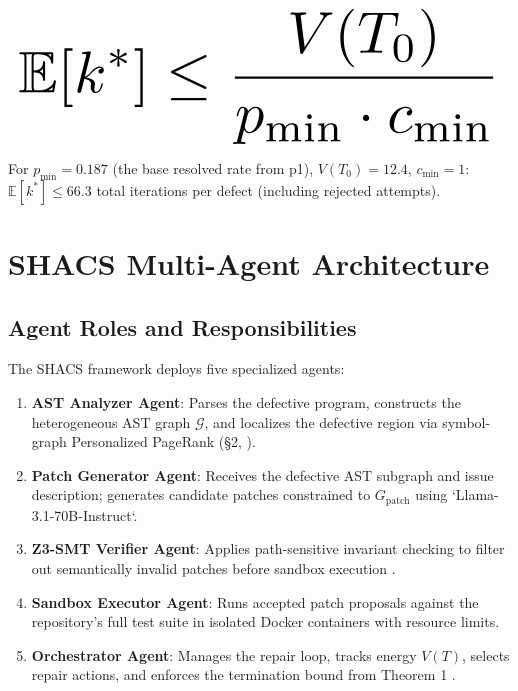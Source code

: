 \documentclass[10pt,twocolumn,letterpaper]{article}
\begin{document}
\begin{equation}
\resizebox{\columnwidth}{!}{$\displaystyle
\begin{aligned}
\mathbb{E}[k^*] \leq \frac{V(T_0)}{p_{\min} \cdot c_{\min}}
\end{aligned}
$}
\end{equation}
























For $p_{\min} = 0.187$ (the base resolved rate from p1), $V(T_0) = 12.4$, $c_{\min} = 1$: $\mathbb{E}[k^*] \leq 66.3$ total iterations per defect (including rejected attempts).




\section{SHACS Multi-Agent Architecture}



\subsection{Agent Roles and Responsibilities}


The SHACS framework deploys five specialized agents:

\begin{enumerate}
  \item \textbf{AST Analyzer Agent}: Parses the defective program, constructs the heterogeneous AST graph $\mathcal{G}$, and localizes the defective region via symbol-graph Personalized PageRank (\S{}2, \cite{crossref_10_1145_3689096_3689462}).
  \item \textbf{Patch Generator Agent}: Receives the defective AST subgraph and issue description; generates candidate patches constrained to $G_{\text{patch}}$ using `Llama-3.1-70B-Instruct`.
  \item \textbf{Z3-SMT Verifier Agent}: Applies path-sensitive invariant checking to filter out semantically invalid patches before sandbox execution \cite{arxiv_2404_01131}.
  \item \textbf{Sandbox Executor Agent}: Runs accepted patch proposals against the repository's full test suite in isolated Docker containers with resource limits.
  \item \textbf{Orchestrator Agent}: Manages the repair loop, tracks energy $V(T)$, selects repair actions, and enforces the termination bound from Theorem 1 \cite{arxiv_2412_06333}.
\end{enumerate}
\end{document}
